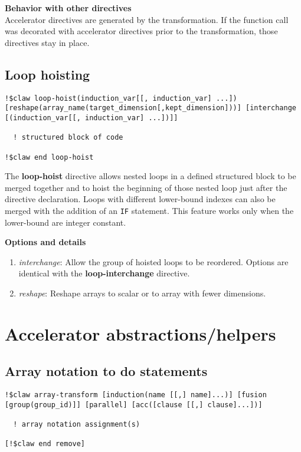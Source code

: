 \documentclass{article}
\begin{document}
\textbf{Behavior with other directives}\\
Accelerator directives are generated by the transformation. If the function call was decorated 
with accelerator directives prior to the transformation, those directives stay in place. 

\subsection{Loop hoisting}
\begin{lstlisting}
!$claw loop-hoist(induction_var[[, induction_var] ...]) [reshape(array_name(target_dimension[,kept_dimension]))] [interchange [(induction_var[[, induction_var] ...])]]

  ! structured block of code
  
!$claw end loop-hoist
\end{lstlisting}

The \textbf{loop-hoist} directive allows nested loops in a defined structured block to
be merged together and to hoist the beginning of those nested loop just after
the directive declaration. Loops with different lower-bound indexes
can also be merged with the addition of an \lstinline!IF! statement. This feature works 
only when the lower-bound are integer constant. 


\textbf{Options and details}
\begin{enumerate}
\item \textit{interchange}: Allow the group of hoisted loops to be reordered.
Options are identical with the \textbf{loop-interchange} directive.
\item \textit{reshape}: Reshape arrays to scalar or to array with fewer dimensions. 
\end{enumerate}


\section{Accelerator abstractions/helpers}

\subsection{Array notation to do statements}

\begin{lstlisting}
!$claw array-transform [induction(name [[,] name]...)] [fusion [group(group_id)]] [parallel] [acc([clause [[,] clause]...])]

  ! array notation assignment(s) 
  
[!$claw end remove]
\end{lstlisting}
\end{document}
